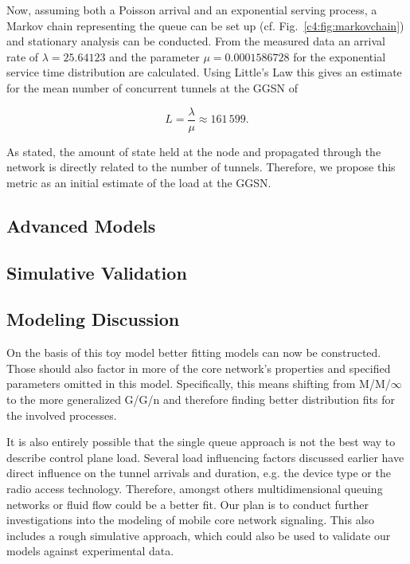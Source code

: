 Now, assuming both a Poisson arrival and an exponential serving process, a Markov chain representing the queue can be set up (cf. Fig.~\ref{c4:fig:markovchain}) and stationary analysis can be conducted. From the measured data an arrival rate of $\lambda=25.64123$ and the parameter $\mu=0.0001586728$ for the exponential service time distribution are calculated. Using Little's Law this gives an estimate for the mean number of concurrent tunnels at the \ac{GGSN} of 

$$
L=\frac{\lambda}{\mu}\approx 161\,599. %
$$

As stated, the amount of state held at the node and propagated through the network is directly related to the number of tunnels. Therefore, we propose this metric as an initial estimate of the load at the \ac{GGSN}.


\subsection{Advanced Models} 



\subsection{Simulative Validation} 



\subsection{Modeling Discussion}

On the basis of this toy model better fitting models can now be constructed. Those should also factor in more of the core network's properties and specified parameters omitted in this model. Specifically, this means shifting from M/M/$\infty$ to the more generalized G/G/n and therefore finding better distribution fits for the involved processes.

It is also entirely possible that the single queue approach is not the best way to describe control plane load. Several load influencing factors discussed earlier have direct influence on the tunnel arrivals and duration, e.g. the device type or the radio access technology. Therefore, amongst others multidimensional queuing networks or fluid flow could be a better fit. Our plan is to conduct further investigations into the modeling of mobile core network signaling. This also includes a rough simulative approach, which could also be used to validate our models against experimental data.

